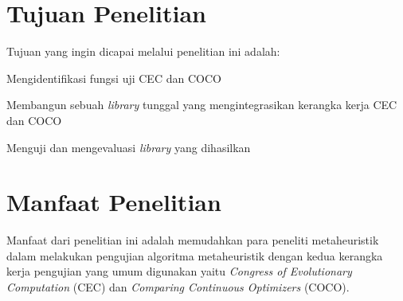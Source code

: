 \section{Tujuan Penelitian}
Tujuan yang ingin dicapai melalui penelitian ini adalah:
\begin{packed_enum}
  \item Mengidentifikasi fungsi uji CEC dan COCO
  \item Membangun sebuah \textit{library} tunggal yang mengintegrasikan kerangka kerja CEC dan COCO
  \item Menguji dan mengevaluasi \textit{library} yang dihasilkan
\end{packed_enum}

\section{Manfaat Penelitian}
Manfaat dari penelitian ini adalah memudahkan para peneliti metaheuristik dalam melakukan pengujian algoritma metaheuristik dengan kedua kerangka kerja pengujian yang umum digunakan yaitu \textit{Congress of Evolutionary Computation} (CEC) dan \textit{Comparing Continuous Optimizers} (COCO).